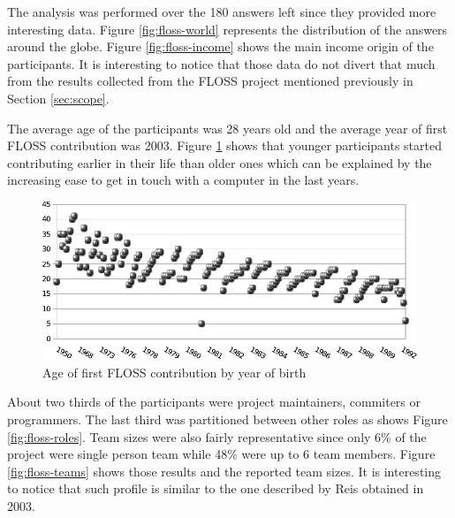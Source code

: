 \documentclass[lnbip]{svmultln}
\begin{document}
The analysis was performed over the 180 answers left since they
provided more interesting data. Figure \ref{fig:floss-world}
represents the distribution of the answers around the globe. Figure
\ref{fig:floss-income} shows the main income origin of the
participants. It is interesting to notice that those data do not
divert that much from the results collected from the FLOSS project
mentioned previously in Section \ref{sec:scope}.

The average age of the participants was 28 years old and the average
year of first FLOSS contribution was 2003. Figure
\ref{fig:floss-firstxp} shows that younger participants started
contributing earlier in their life than older ones which can be
explained by the increasing ease to get in touch with a computer in
the last years.

\begin{figure}[htb]
  \centering
  \includegraphics[scale=.9]{floss-firstxp.pdf}
  \caption{Age of first FLOSS contribution by year of birth}
  \label{fig:floss-firstxp}
\end{figure}

About two thirds of the participants were project maintainers,
commiters or programmers. The last third was partitioned between other
roles as shows Figure \ref{fig:floss-roles}. Team sizes were also
fairly representative since only 6\% of the project were single person
team while 48\% were up to 6 team members. Figure
\ref{fig:floss-teams} shows those results and the reported team
sizes. It is interesting to notice that such profile is similar to the
one described by Reis \cite{reis2003} obtained in 2003.
\end{document}
